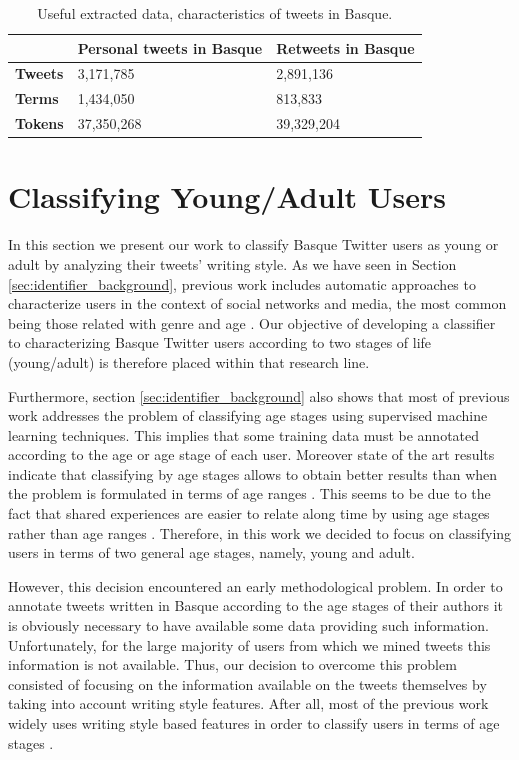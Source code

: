 \documentclass[information,article,submit,moreauthors,pdftex,10pt,a4paper]{Definitions/mdpi}
\begin{document}
\begin{table}[H]
  \centering
  \begin{tabular}{|l|l|l|}
    \hline
     & \textbf{Personal tweets in Basque} & \textbf{Retweets in Basque}\\ \hline
    \textbf{Tweets} & 3,171,785 & 2,891,136\\ \hline
    \textbf{Terms} & 1,434,050 & 813,833\\ \hline
    \textbf{Tokens}  & 37,350,268 & 39,329,204\\ \hline
  \end{tabular}
  \caption{Useful extracted data, characteristics of tweets in Basque.}
  \label{tab:useful-data}
\end{table}

\section{Classifying Young/Adult Users}\label{sec:class-young-users}

In this section we present our work to classify Basque Twitter users as young or adult by analyzing their tweets' writing style. As we have seen in Section \ref{sec:identifier_background}, previous work includes automatic approaches to characterize users in the context of social networks and media, the most common being those related with genre and age \citep{cesare2017detection}. Our objective of developing a classifier to characterizing Basque Twitter users according to two stages of life (young/adult) is therefore placed within that research line.

Furthermore, section \ref{sec:identifier_background} also shows that most of previous work addresses the problem of classifying age stages using supervised machine learning techniques. This implies that some training data must be annotated according to the age or age stage of each user. Moreover state of the art  results indicate that classifying by age stages allows to obtain better results than when the problem is formulated in terms of age ranges \citep{nguyen2013old}. This seems to be due to the fact that shared experiences are easier to relate along time by using age stages rather than age ranges \citep{nguyen2016computational,eckert2017age}. Therefore, in this work we decided to focus on classifying users in terms of two general age stages, namely, young and adult.

However, this decision encountered an early methodological problem. In order to annotate tweets written in Basque according to the age stages of their authors it is obviously necessary to have available some data providing such information. Unfortunately, for the large majority of users from which we mined tweets this information is not available. Thus, our decision to overcome this problem consisted of focusing on the information available on the tweets themselves by taking into account writing style features. After all, most of the previous work widely uses writing style based features in order to classify users in terms of age stages \citep{rao2010classifying,al2012homophily,nguyen2013old,morgan2017predicting}.
\end{document}
